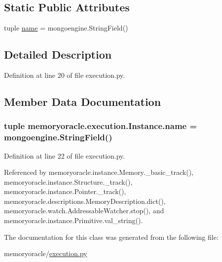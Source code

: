 \subsection*{Static Public Attributes}
\begin{DoxyCompactItemize}
\item 
tuple \hyperlink{classmemoryoracle_1_1execution_1_1Instance_a0b381415b78c833a371ba36d35ac4095}{name} = mongoengine.\+String\+Field()
\end{DoxyCompactItemize}


\subsection{Detailed Description}


Definition at line 20 of file execution.\+py.



\subsection{Member Data Documentation}
\hypertarget{classmemoryoracle_1_1execution_1_1Instance_a0b381415b78c833a371ba36d35ac4095}{}
\subsubsection[{name}]{\setlength{\rightskip}{0pt plus 5cm}tuple memoryoracle.\+execution.\+Instance.\+name = mongoengine.\+String\+Field()\hspace{0.3cm}{\ttfamily [static]}}\label{classmemoryoracle_1_1execution_1_1Instance_a0b381415b78c833a371ba36d35ac4095}


Definition at line 22 of file execution.\+py.



Referenced by memoryoracle.\+instance.\+Memory.\+\_\+basic\+\_\+track(), memoryoracle.\+instance.\+Structure.\+\_\+track(), memoryoracle.\+instance.\+Pointer.\+\_\+track(), memoryoracle.\+descriptions.\+Memory\+Description.\+dict(), memoryoracle.\+watch.\+Addressable\+Watcher.\+stop(), and memoryoracle.\+instance.\+Primitive.\+val\+\_\+string().



The documentation for this class was generated from the following file\+:\begin{DoxyCompactItemize}
\item 
memoryoracle/\hyperlink{execution_8py}{execution.\+py}\end{DoxyCompactItemize}
